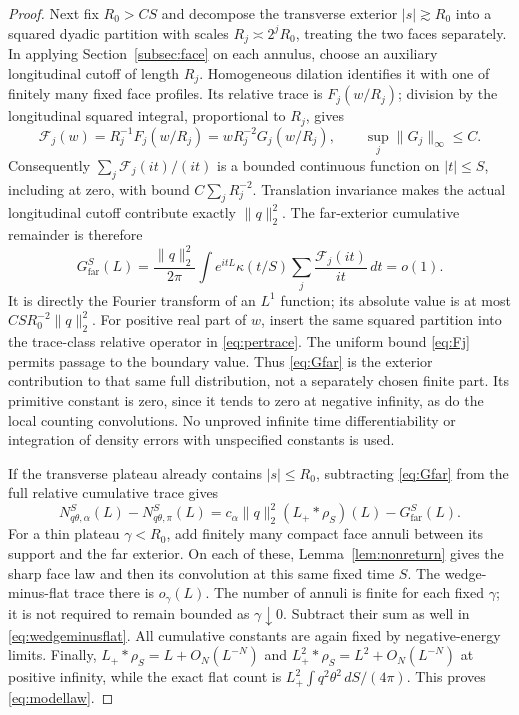 \documentclass[11pt]{amsart}
\numberwithin{equation}{section}
\theoremstyle{remark}
\begin{document}
\begin{proof}
Next fix $R_0>CS$ and decompose the transverse exterior $|s|\gtrsim R_0$ into a squared dyadic partition with scales $R_j\asymp2^jR_0$, treating the two faces separately. In applying Section~\ref{subsec:face} on each annulus, choose an auxiliary longitudinal cutoff of length $R_j$. Homogeneous dilation identifies it with one of finitely many fixed face profiles. Its relative trace is $F_j(w/R_j)$; division by the longitudinal squared integral, proportional to $R_j$, gives
\begin{equation}\label{eq:Fj}
\mathcal F_j(w)=R_j^{-1}F_j(w/R_j)=wR_j^{-2}G_j(w/R_j),\qquad \sup_j\|G_j\|_\infty\le C .
\end{equation}
Consequently $\sum_j\mathcal F_j(it)/(it)$ is a bounded continuous function on $|t|\le S$, including at zero, with bound $C\sum_jR_j^{-2}$. Translation invariance makes the actual longitudinal cutoff contribute exactly $\|q\|_2^2$. The far-exterior cumulative remainder is therefore
\begin{equation}\label{eq:Gfar}
G^S_{\mathrm{far}}(L)=\frac{\|q\|_2^2}{2\pi}\int e^{itL}\kappa(t/S)\sum_j\frac{\mathcal F_j(it)}{it}\,dt=o(1) .
\end{equation}
It is directly the Fourier transform of an $L^1$ function; its absolute value is at most $CSR_0^{-2}\|q\|_2^2$. For positive real part of $w$, insert the same squared partition into the trace-class relative operator in \eqref{eq:pertrace}. The uniform bound \eqref{eq:Fj} permits passage to the boundary value. Thus \eqref{eq:Gfar} is the exterior contribution to that same full distribution, not a separately chosen finite part. Its primitive constant is zero, since it tends to zero at negative infinity, as do the local counting convolutions. No unproved infinite time differentiability or integration of density errors with unspecified constants is used.

If the transverse plateau already contains $|s|\le R_0$, subtracting \eqref{eq:Gfar} from the full relative cumulative trace gives
\begin{equation}\label{eq:wedgeminusflat}
N^S_{q\theta,\alpha}(L)-N^S_{q\theta,\pi}(L)=c_\alpha\|q\|_2^2(L_+*\rho_S)(L)-G^S_{\mathrm{far}}(L) .
\end{equation}
For a thin plateau $\gamma<R_0$, add finitely many compact face annuli between its support and the far exterior. On each of these, Lemma~\ref{lem:nonreturn} gives the sharp face law and then its convolution at this same fixed time $S$. The wedge-minus-flat trace there is $o_\gamma(L)$. The number of annuli is finite for each fixed $\gamma$; it is not required to remain bounded as $\gamma\downarrow0$. Subtract their sum as well in \eqref{eq:wedgeminusflat}. All cumulative constants are again fixed by negative-energy limits. Finally, $L_+*\rho_S=L+O_N(L^{-N})$ and $L_+^2*\rho_S=L^2+O_N(L^{-N})$ at positive infinity, while the exact flat count is $L_+^2\int q^2\theta^2\,dS/(4\pi)$. This proves \eqref{eq:modellaw}.
\end{proof}
\end{document}
